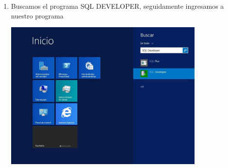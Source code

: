 \begin{enumerate}[1.]
	\hfill \break
	\hfill \break
	\hfill \break
	\hfill \break
	\hfill \break
	\hfill \break
	\hfill \break
	\hfill \break
	\item Buscamos el programa SQL DEVELOPER, seguidamente ingresamos a nuestro programa\\
	\begin{center}
	\includegraphics[width=10cm]{./Imagenes/mire8} 
	\end{center}
	
\end{enumerate} 
